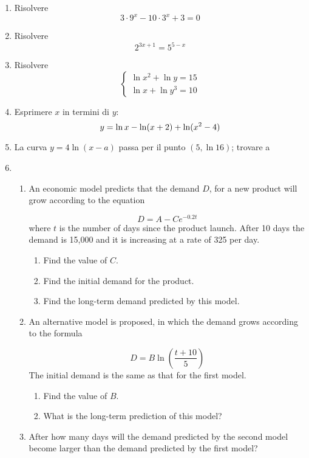 \begin{enumerate}
\item Risolvere 
\begin{equation*}
3\cdot 9^x -10\cdot 3^x + 3 = 0
\end{equation*}
\item Risolvere 
\begin{equation*}
2^{3x+1}=5^{5-x}
\end{equation*}
\item Risolvere 
\begin{equation*}
\left\{
\begin{array}{ll}
\ln x^2 + \ln y =15\\
\ln x + \ln y^3 = 10
\end{array}
\right.
\end{equation*}
\item Esprimere $x$ in termini di $y$:
\begin{equation*}
y=\ln x-\ln(x+2)+\ln(x^2-4)\\
\end{equation*}
\item La curva $y=4\ln(x-a)$ passa per il punto $(5, \ln 16)$; trovare a
\item
\begin{enumerate}
\item 
An economic model predicts that the demand $D$, for a new product will grow according to the equation

\begin{equation*}
D = A - Ce^{-0.2t}
\end{equation*}
where $t$ is the number of days since the product launch.
After 10 days the demand is 15,000 and it is increasing at a rate of 325 per day.

\begin{enumerate}
\item Find the value of $C$.
\item Find the initial demand for the product.
\item Find the long-term demand predicted by this model.
\end{enumerate}
\item  An alternative model is proposed, in which the demand grows according to the formula

\begin{equation*}
D=B\ln\left(
\frac{
t+10
}{
5
}
\right)
\end{equation*}
The initial demand is the same as that for the first model.

\begin{enumerate}
\item Find the value of $B$.
\item What is the long-term prediction of this model?
\end{enumerate}

\item After how many days will the demand predicted by the second model become larger than the demand predicted by the first model?

\end{enumerate}
\end{enumerate}

